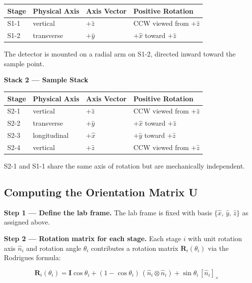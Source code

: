 \documentclass[12pt]{article}
\begin{document}
\begin{center}
\begin{tabular}{llll}
\toprule
Stage & Physical Axis & Axis Vector & Positive Rotation \\
\midrule
S1-1 & vertical & $+\hat{z}$ & CCW viewed from $+\hat{z}$ \\
S1-2 & transverse  & $+\hat{y}$ & $+\hat{x}$ toward $+\hat{z}$ \\
\bottomrule
\end{tabular}
\end{center}

The detector is mounted on a radial arm on S1-2, directed inward toward the sample point.

\textbf{Stack 2 --- Sample Stack}

\begin{center}
\begin{tabular}{llll}
\toprule
Stage & Physical Axis & Axis Vector & Positive Rotation \\
\midrule
S2-1 & vertical     & $+\hat{z}$ & CCW viewed from $+\hat{z}$ \\
S2-2 & transverse      & $+\hat{y}$ & $+\hat{x}$ toward $+\hat{z}$ \\
S2-3 & longitudinal & $+\hat{x}$ & $+\hat{y}$ toward $+\hat{z}$ \\
S2-4 & vertical     & $+\hat{z}$ & CCW viewed from $+\hat{z}$ \\
\bottomrule
\end{tabular}
\end{center}

S2-1 and S1-1 share the same axis of rotation but are mechanically independent.

\subsection*{Computing the Orientation Matrix \textbf{U}}

\textbf{Step 1 --- Define the lab frame.}
The lab frame is fixed with basis $\{\hat{x},\, \hat{y},\, \hat{z}\}$ as assigned above.

\textbf{Step 2 --- Rotation matrix for each stage.}
Each stage $i$ with unit rotation axis $\hat{n}_i$ and rotation angle $\theta_i$
contributes a rotation matrix $\mathbf{R}_i(\theta_i)$ via the Rodrigues formula:

\begin{equation}
  \mathbf{R}_i(\theta_i)
  = \mathbf{I}\cos\theta_i
  + (1 - \cos\theta_i)\,(\hat{n}_i \otimes \hat{n}_i)
  + \sin\theta_i\,[\hat{n}_i]_\times
\end{equation}
\end{document}
